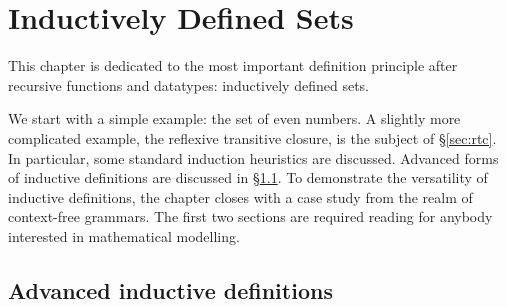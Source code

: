 \chapter{Inductively Defined Sets} \label{chap:inductive}

This chapter is dedicated to the most important definition principle after
recursive functions and datatypes: inductively defined sets.

We start with a simple example: the set of even numbers.  A slightly more
complicated example, the reflexive transitive closure, is the subject of
{\S}\ref{sec:rtc}. In particular, some standard induction heuristics are
discussed. Advanced forms of inductive definitions are discussed in
{\S}\ref{sec:adv-ind-def}. To demonstrate the versatility of inductive
definitions, the chapter closes with a case study from the realm of
context-free grammars. The first two sections are required reading for anybody
interested in mathematical modelling.





\section{Advanced inductive definitions}
\label{sec:adv-ind-def}




